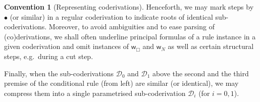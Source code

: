 \documentclass[manuscript,screen]{acmart}
\theoremstyle{definition}
\newtheorem{conv}[thm]{Convention}
\theoremstyle{remark}
\newcommand{\n}{N}
\newcommand{\sq}{\Box}
\newcommand{\der}{\mathcal{D}}
\newcommand{\wk}{\mathsf{w}}
\begin{document}
\begin{conv}[Representing coderivations]\label{conv:convention}
Henceforth, we may mark steps by $\bullet$ (or similar) in a regular coderivation to indicate roots of identical sub-coderivations. Moreover, to avoid ambiguities and  to ease parsing of (co)derivations, we shall often underline principal formulas of a  rule instance in a given coderivation and omit instances of $\wk_{\sq}$ and $\wk_\n$ as well as certain structural steps, e.g.\ during a cut step. 

Finally, when the sub-coderivations $\der_0$ and $\der_1$ above the second and the third premise of the conditional rule (from left) are similar (or identical), we may compress them into a single parametrised sub-coderivation $\der_i$ (for $i=0,1$).
\end{conv}
\end{document}

